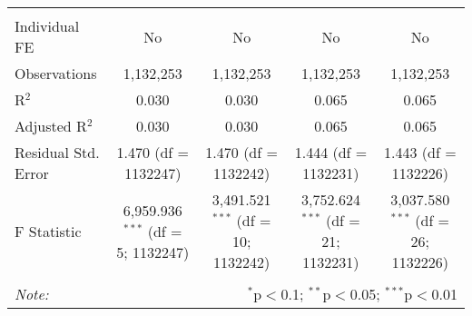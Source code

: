 \documentclass[
]{article}
\begin{document}
\begin{table}[!htbp]
{\begin{tabular}{@{\extracolsep{5pt}}lcccc}
\hline \\[-1.8ex] 
Individual FE & No & No & No & No \\ 
Observations & 1,132,253 & 1,132,253 & 1,132,253 & 1,132,253 \\ 
R$^{2}$ & 0.030 & 0.030 & 0.065 & 0.065 \\ 
Adjusted R$^{2}$ & 0.030 & 0.030 & 0.065 & 0.065 \\ 
Residual Std. Error & 1.470 (df = 1132247) & 1.470 (df = 1132242) & 1.444 (df = 1132231) & 1.443 (df = 1132226) \\ 
F Statistic & 6,959.936$^{***}$ (df = 5; 1132247) & 3,491.521$^{***}$ (df = 10; 1132242) & 3,752.624$^{***}$ (df = 21; 1132231) & 3,037.580$^{***}$ (df = 26; 1132226) \\ 
\hline 
\hline \\[-1.8ex] 
\textit{Note:}  & \multicolumn{4}{r}{$^{*}$p$<$0.1; $^{**}$p$<$0.05; $^{***}$p$<$0.01} \\ 
\end{tabular}
} 
\end{table} 
\newpage
\end{document}
